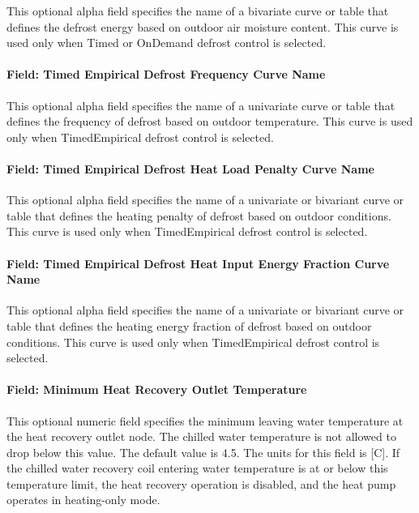 This optional alpha field specifies the name of a bivariate curve or table that defines the defrost energy based on outdoor air moisture content. This curve is used only when Timed or OnDemand defrost control is selected.

\paragraph{Field: Timed Empirical Defrost Frequency Curve Name}\label{plhp_eir_heating_inputs_timed_empirical_defrost_frequency_curve_name}

This optional alpha field specifies the name of a univariate curve or table that defines the frequency of defrost based on outdoor temperature. This curve is used only when TimedEmpirical defrost control is selected.

\paragraph{Field: Timed Empirical Defrost Heat Load Penalty Curve Name}\label{plhp_eir_heating_inputs_timed_empirical_defrost_heat_load_curve_name}

This optional alpha field specifies the name of a univariate or bivariant curve or table that defines the heating penalty of defrost based on outdoor conditions. This curve is used only when TimedEmpirical defrost control is selected.

\paragraph{Field: Timed Empirical Defrost Heat Input Energy Fraction Curve Name}\label{plhp_eir_heating_inputs_timed_empirical_defrost_heat_energy_fraction_curve_name}

This optional alpha field specifies the name of a univariate or bivariant curve or table that defines the heating energy fraction of defrost based on outdoor conditions. This curve is used only when TimedEmpirical defrost control is selected.

\paragraph{Field: Minimum Heat Recovery Outlet Temperature}\label{plhp_eir_heating_inputs_minimum_heat_recovery_outlet_temperature}

This optional numeric field specifies the minimum leaving water temperature at the heat recovery outlet node. The chilled water temperature is not allowed to drop below this value. The default value is 4.5. The units for this field is [C]. If the chilled water recovery coil entering water temperature is at or below this temperature limit, the heat recovery operation is disabled, and the heat pump operates in heating-only mode.

